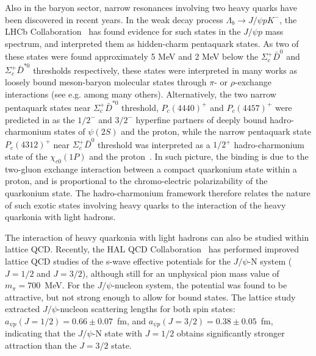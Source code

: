 \documentclass[prd,amsmath,%
twocolumn,floatfix,amssymb, preprintnumbers, nofootinbib, superscriptaddress]{revtex4}
\begin{document}
Also in the baryon sector, narrow resonances involving two heavy quarks have been discovered in recent years. In the weak decay process
$\Lambda_b \to J/\psi p K^-$, the LHCb Collaboration~\cite{Aaij:2015tga, Aaij:2019vzc} 
has found evidence for such states in the  
$J/\psi p$ mass spectrum, 
and interpreted them as hidden-charm pentaquark states. 
As two of these states were found approximately 5 MeV and 2 MeV below the $\Sigma_c^+ \bar D^0$ and $\Sigma_c^+ \bar D^{\ast 0}$ thresholds respectively, these states were interpreted in many works as loosely bound meson-baryon molecular states through $\pi$- or $\rho$-exchange interactions (see e.g. \cite{Roca:2015dva} among many others).  
Alternatively, the two narrow pentaquark states near $\Sigma_c^+ \bar D^{\ast 0}$ threshold, $P_c(4440)^+$ and $P_c(4457)^+$ were predicted in \cite{Eides:2015dtr} as the $1/2^-$ and $3/2^-$ hyperfine partners of deeply bound hadro-charmonium states of $\psi(2S)$ and the proton, while the narrow pentaquark state $P_c(4312)^+$ 
near $\Sigma_c^+ \bar D^0$ threshold was interpreted as a $1/2^+$ hadro-charmonium state of the $\chi_{c0}(1P)$ and the proton~\cite{Eides:2019tgv}. In such picture, the binding is due to the two-gluon exchange interaction between a compact quarkonium state within a proton, and is proportional to the chromo-electric polarizability of the quarkonium state. 
The hadro-charmonium framework therefore relates the nature of such exotic states involving heavy quarks to the interaction of the heavy quarkonia with light hadrons. 

The interaction of heavy quarkonia with light hadrons can 
also be studied within lattice QCD. 
Recently, the HAL QCD Collaboration~\cite{Sugiura:2019pye}  has performed improved lattice QCD studies of the s-wave effective potentials for 
the  $J/\psi$-N system ($J = 1/2$ and $J = 3/2$), although still for an unphysical pion mass value of $m_\pi = 700$~MeV. For the $J/\psi$-nucleon system, the potential was found to be attractive, but not strong enough to allow for bound states. The lattice study extracted $J/\psi$-nucleon scattering lengths for both spin states: 
$a_{\psi p}(J = 1/2) = 0.66 \pm 0.07$~fm, and 
$a_{\psi p}(J = 3/2) = 0.38 \pm 0.05$~fm, indicating that the $J/\psi$-N state with 
$J = 1/2$  obtains significantly stronger attraction than the $J = 3/2$ state. 
\end{document}
